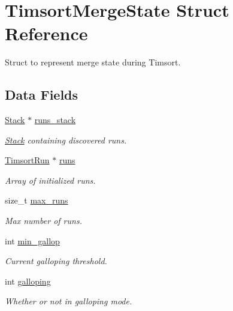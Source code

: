\hypertarget{structTimsortMergeState}{}\section{Timsort\+Merge\+State Struct Reference}
\label{structTimsortMergeState}


Struct to represent merge state during Timsort.  


\subsection*{Data Fields}
\begin{DoxyCompactItemize}
\item 
\mbox{\label{structTimsortMergeState_a4cde6b50acb89f6a6d71b19475502209}} 
\hyperlink{structStack}{Stack} $\ast$ \hyperlink{structTimsortMergeState_a4cde6b50acb89f6a6d71b19475502209}{runs\+\_\+stack}
\begin{DoxyCompactList}\small\item\em \hyperlink{structStack}{Stack} containing discovered runs. \end{DoxyCompactList}\item 
\mbox{\label{structTimsortMergeState_a4eb61fa3007911eeeabe210681e05a16}} 
\hyperlink{structTimsortRun}{Timsort\+Run} $\ast$ \hyperlink{structTimsortMergeState_a4eb61fa3007911eeeabe210681e05a16}{runs}
\begin{DoxyCompactList}\small\item\em Array of initialized runs. \end{DoxyCompactList}\item 
\mbox{\label{structTimsortMergeState_a7a2c909e984e074738fec5870da174aa}} 
size\+\_\+t \hyperlink{structTimsortMergeState_a7a2c909e984e074738fec5870da174aa}{max\+\_\+runs}
\begin{DoxyCompactList}\small\item\em Max number of runs. \end{DoxyCompactList}\item 
\mbox{\label{structTimsortMergeState_a382c0762f06c680bb4fec455f8823bf1}} 
int \hyperlink{structTimsortMergeState_a382c0762f06c680bb4fec455f8823bf1}{min\+\_\+gallop}
\begin{DoxyCompactList}\small\item\em Current galloping threshold. \end{DoxyCompactList}\item 
\mbox{\label{structTimsortMergeState_ab45c7800608ba6dd2b3d7f7b68bafb68}} 
int \hyperlink{structTimsortMergeState_ab45c7800608ba6dd2b3d7f7b68bafb68}{galloping}
\begin{DoxyCompactList}\small\item\em Whether or not in galloping mode. \end{DoxyCompactList}\end{DoxyCompactItemize}


